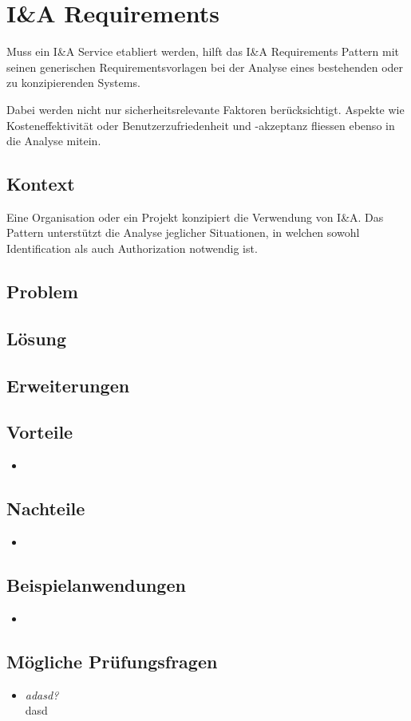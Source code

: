 \section{I\&A Requirements}

Muss ein I\&A Service etabliert werden, hilft das I\&A Requirements Pattern mit seinen generischen Requirementsvorlagen bei der Analyse eines bestehenden oder zu konzipierenden Systems.

Dabei werden nicht nur sicherheitsrelevante Faktoren berücksichtigt. Aspekte wie Kosteneffektivität oder Benutzerzufriedenheit und -akzeptanz fliessen ebenso in die Analyse mitein.

\subsection*{Kontext}
Eine Organisation oder ein Projekt konzipiert die Verwendung von I\&A. Das Pattern unterstützt die Analyse jeglicher Situationen, in welchen sowohl Identification als auch Authorization notwendig ist.

\subsection*{Problem}


\subsection*{Lösung}


\subsection*{Erweiterungen}

\subsection*{Vorteile}
\begin{itemize}
	\item 
\end{itemize}

\subsection*{Nachteile}
\begin{itemize}
	\item 
\end{itemize}

\subsection*{Beispielanwendungen}
\begin{itemize}
	\item 
\end{itemize}

\subsection*{Mögliche Prüfungsfragen}
\begin{itemize}
	\item \emph{adasd?}\\
	dasd
\end{itemize}